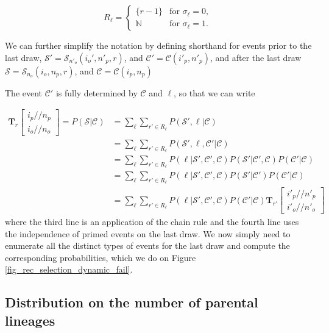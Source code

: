 \documentclass[9pt,twocolumn,twoside,lineno]{gsajnl}
\newcommand{\dslash}{/\!\!/}
\newcommand{\Coalc}[4]{\begin{bmatrix}#1\dslash #2 \\ #3\dslash #4 \end{bmatrix}}
\newcommand{\CC}{\mathcal{C}}
\newcommand{\ms}{\mathcal{S}}
\begin{document}
\begin{equation}
  R_\ell = \begin{cases}
    \{r-1\}    & \text{for } \sigma_\ell = 0, \\
    \mathbb{N} & \text{for } \sigma_\ell = 1.
  \end{cases}
\end{equation}

We can further simplify the notation by defining shorthand for events prior to the last draw,
 $\ms' = \ms_{n'_o}(i_o', n'_p, r)$, and $\CC' = \CC{(i'_p,n'_p)}$, and after the
last draw $\ms = \ms_{n_o}(i_o, n_p, r)$, and $\CC = \CC{(i_p,n_p)}$

The event  $\CC'$ is fully determined by  $\CC$ and $\ell$, so that we can write

\begin{equation}
  \begin{split}
    \mathbf{T}_{r}\Coalc{i_p}{n_p}{i_o}{n_o} = P(\ms| \CC) &= \sum_\ell \sum_{r' \in R_\ell}
    P(\ms',\ell | \CC) \\
    &=\sum_\ell \sum_{r' \in R_\ell}P( \ms',\ell, \CC' |\CC) \\
    &=\sum_\ell \sum_{r' \in R_\ell}P(\ell | \ms', \CC', \CC ) P( \ms'| \CC', \CC)  P(\CC' |\CC) \\
    &=\sum_\ell \sum_{r' \in R_\ell}P(\ell | \ms', \CC', \CC ) P( \ms'| \CC')       P(\CC' |\CC) \\
    &=\sum_\ell \sum_{r' \in R_\ell}P(\ell | \ms', \CC', \CC ) P(\CC' |\CC)  \mathbf{T}_{r'}\Coalc{i'_p}{n'_p}{i'_o}{n'_o}
  \end{split}
\end{equation}
where the third line is an application of the chain rule and the fourth line uses the independence
of primed events on the last draw.  We now simply need to enumerate all the distinct types of
events for the last draw and compute the corresponding probabilities, which we do on Figure
\ref{fig_rec_selection_dynamic_fail}.

\subsection{Distribution on the number of parental lineages}


\end{document}
